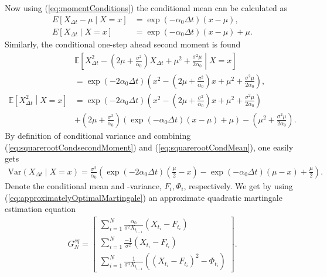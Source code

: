 Now using (\ref{eq:momentConditions}) the conditional mean can be calculated as
\begin{align}
    E\left[X_{\Delta t} - \mu \middle| X = x\right] &= \exp\left(-\alpha_0\Delta t\right)\left(x-\mu\right),\\
    E\left[X_{\Delta t} \middle| X = x\right] &= \exp\left(-\alpha_0\Delta t\right)\left(x-\mu\right) + \mu. \label{eq:squarerootCondMean}
\end{align}
Similarly, the conditional one-step ahead second moment is found
\begin{align}
    &\mathbb{E}\left[X_{\Delta t}^2 - \left(2\mu + \frac{\sigma^2}{\alpha_0}\right)X_{\Delta t} + \mu^2 + \frac{\sigma^2\mu}{2\alpha_0} \middle| X = x \right] \nonumber \\
    &= \exp\left(-2\alpha_0 \Delta t\right)\left(x^2 - \left(2\mu + \frac{\sigma^2}{\alpha_0}\right)x + \mu^2 + \frac{\sigma^2 \mu}{2\alpha_0}\right),\\
    \mathbb{E}\left[X_{\Delta t}^2 \middle| X = x\right] &= \exp\left(-2\alpha_0 \Delta t\right)\left(x^2 - \left(2\mu + \frac{\sigma^2}{\alpha_0}\right)x + \mu^2 + \frac{\sigma^2 \mu}{2\alpha_0}\right)  \nonumber  \\
     &+ \left(2\mu + \frac{\sigma^2}{\alpha_0}\right) \left(\exp\left(-\alpha_0\Delta t \right)\left(x-\mu\right) + \mu\right) - \left(\mu^2 + \frac{\sigma^2\mu}{2\alpha_0}\right). \label{eq:squarerootCondsecondMoment}
\end{align}
By definition of conditional variance and combining (\ref{eq:squarerootCondsecondMoment}) and (\ref{eq:squarerootCondMean}), one easily gets
\begin{align}
    \mathrm{Var}\left(X_{\Delta t} \middle| X = x \right) = \frac{\sigma^2}{\alpha_0}\left(\exp\left(-2\alpha_0\Delta t \right)\left(\frac{\mu}{2} - x   \right) - \exp\left(-\alpha_0\Delta t\right)\left(\mu - x\right) + \frac{\mu}{2}\right). \label{eq:squarerootCondVariance}
\end{align}
Denote the conditional mean and -variance, $F_i, \Phi_i$, respectively. We get by using (\ref{eq:approximatelyOptimalMartingale}) an approximate quadratic martingale estimation equation
\begin{align}
        G_N^{sq} = \begin{bmatrix}
            \sum_{i = 1}^N \frac{\alpha_0}{\sigma^2 X_{t_{i-1}}}\left(X_{t_i} - F_{t_i}\right)\\
            \sum_{i = 1}^N \frac{-1}{\sigma^2}\left(X_{t_i} - F_{t_i}\right)\\
            \sum_{i = 1}^N \frac{1}{\sigma^3 X_{t_{i-1}}}\left(\left(X_{t_i} - F_{t_i}\right)^2 - \Phi_{t_i}\right) \label{eq:squarerootMartingaleEquation}
        \end{bmatrix}.
\end{align}
